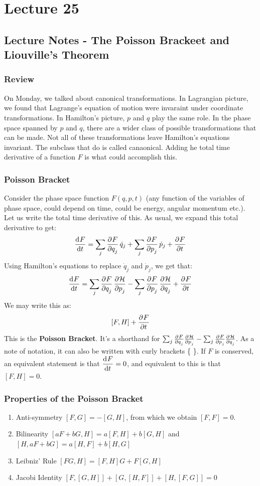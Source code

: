 \section{Lecture 25}
\subsection{Lecture Notes - The Poisson Brackeet and Liouville's Theorem}
\subsubsection{Review}
On Monday, we talked about canonical transformations. In Lagrangian picture, we found that Lagrange's equation of motion were invaraint under coordinate transformations. In Hamilton's picture, $p$ and $q$ play the same role. In the phase space spanned by $p$ and $q$, there are a wider class of possible transformations that can be made. Not all of these transformations leave Hamilton's equations invariant. The subclass that do is called canaonical. Adding he total time derivative of a function $F$ is what could accomplish this. 

\subsubsection{Poisson Bracket}
Consider the phase space function $F(q, p, t)$ (any function of the variables of phase space, could depend on time, could be energy, angular momentum etc.). Let us write the total time derivative of this. As usual, we expand this total derivative to get:
\[\dod{F}{t} = \sum_j \dpd{F}{q_j}\dot{q}_j + \sum_j\dpd{F}{p_j}\dot{p}_j + \dpd{F}{t}\]
Using Hamilton's equations to replace $\dot{q}_j$ and $\dot{p}_j$, we get that:
\[\dod{F}{t} = \sum_j\dpd{F}{q_j}\dpd{\HH}{p_j} - \sum_j\dpd{F}{p_j}\dpd{\HH}{q_j} + \dpd{F}{t}\]
We may write this as:
\[[F, H] + \dpd{F}{t}\]
This is the \textbf{Poisson Bracket}. It's a shorthand for $\sum_j\pd{F}{q_j}\pd{\HH}{p_j} - \sum_j\pd{F}{p_j}\pd{\HH}{q_j}$. As a note of notation, it can also be written with curly brackets \{ \}. If $F$ is conserved, an equivalent statement is that $\dod{F}{t} = 0$, and equivalent to this is that $[F, H] = 0$. 

\subsubsection{Properties of the Poisson Bracket}
\begin{enumerate}
    \item Anti-symmetry $[F, G] = -[G, H]$, from which we obtain $[F, F] = 0$.
    \item Bilinearity $[aF + bG, H] = a[F, H] + b[G, H]$ and $[H, aF + bG] = a[H, F] + b[H, G]$
    \item Leibniz' Rule $[FG, H] = [F, H]G + F[G, H]$
    \item Jacobi Identity $[F, [G, H]] + [G, [H, F]] + [H, [F, G]] = 0$
\end{enumerate}


